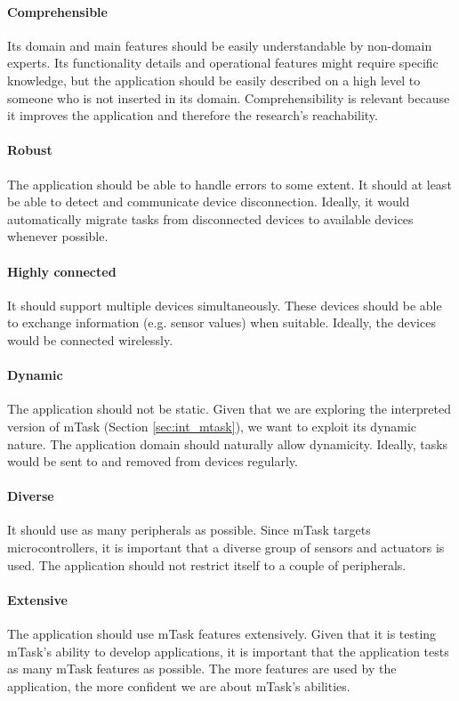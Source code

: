 \paragraph{Comprehensible} Its domain and main features should be easily understandable by non-domain experts. Its functionality details and operational features might require specific knowledge, but the application should be easily described on a high level to someone who is not inserted in its domain. Comprehensibility is relevant because it improves the application and therefore the research's reachability. 

\paragraph{Robust} The application should be able to handle errors to some extent. It should at least be able to detect and communicate device disconnection. Ideally, it would automatically migrate tasks from disconnected devices to available devices whenever possible. 

\paragraph{Highly connected} It should support multiple devices simultaneously. These devices should be able to exchange information (e.g. sensor values) when suitable. Ideally, the devices would be connected wirelessly.

\paragraph{Dynamic} The application should not be static. Given that we are exploring the interpreted version of mTask (Section \ref{sec:int_mtask}), we want to exploit its dynamic nature. The application domain should naturally allow dynamicity. Ideally, tasks would be sent to and removed from devices regularly.

\paragraph{Diverse} It should use as many peripherals as possible. Since mTask targets microcontrollers, it is important that a diverse group of sensors and actuators is used. The application should not restrict itself to a couple of peripherals. 

\paragraph{Extensive} The application should use mTask features extensively. Given that it is testing mTask's ability to develop applications, it is important that the application tests as many mTask features as possible. The more features are used by the application, the more confident we are about mTask's abilities.

